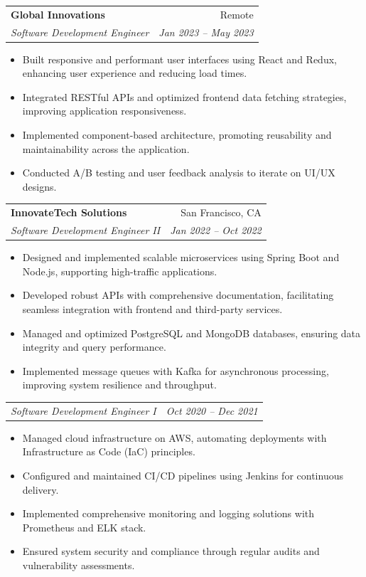 \documentclass[letterpaper,10pt]{article}
\makeatletter
\newcommand{\resumeSubheading}[4]{
  \vspace{-1pt}\item
    \begin{tabular*}{0.97\textwidth}[t]{l@{\extracolsep{\fill}}r}
      \textbf{#1} & #2 \\
      \textit{\footnotesize#3} & \textit{\footnotesize #4} \\
    \end{tabular*}\vspace{-5pt}
}
\newcommand{\resumeSubSubheading}[2]{
    \begin{tabular*}{0.97\textwidth}{l@{\extracolsep{\fill}}r}
      \textit{\footnotesize#1} & \textit{\footnotesize #2} \\
    \end{tabular*}\vspace{-5pt}
}
\newcommand{\resumeItemListStart}{\begin{itemize}}
\newcommand{\resumeItemListEnd}{\end{itemize}\vspace{-5pt}}
\makeatother
\begin{document}
    \resumeSubheading
      {Global Innovations}{Remote}
      {Software Development Engineer}{Jan 2023 -- May 2023}
      \resumeItemListStart
        \item \small Built responsive and performant user interfaces using React and Redux, enhancing user experience and reducing load times.
        \item \small Integrated RESTful APIs and optimized frontend data fetching strategies, improving application responsiveness.
        \item \small Implemented component-based architecture, promoting reusability and maintainability across the application.
        \item \small Conducted A/B testing and user feedback analysis to iterate on UI/UX designs.
      \resumeItemListEnd

    \resumeSubheading
      {InnovateTech Solutions}{San Francisco, CA}
      {Software Development Engineer II}{Jan 2022 -- Oct 2022}
      \resumeItemListStart
        \item \small Designed and implemented scalable microservices using Spring Boot and Node.js, supporting high-traffic applications.
        \item \small Developed robust APIs with comprehensive documentation, facilitating seamless integration with frontend and third-party services.
        \item \small Managed and optimized PostgreSQL and MongoDB databases, ensuring data integrity and query performance.
        \item \small Implemented message queues with Kafka for asynchronous processing, improving system resilience and throughput.
      \resumeItemListEnd

      \resumeSubSubheading{Software Development Engineer I}{Oct 2020 -- Dec 2021}
      \resumeItemListStart
        \item \small Managed cloud infrastructure on AWS, automating deployments with Infrastructure as Code (IaC) principles.
        \item \small Configured and maintained CI/CD pipelines using Jenkins for continuous delivery.
        \item \small Implemented comprehensive monitoring and logging solutions with Prometheus and ELK stack.
        \item \small Ensured system security and compliance through regular audits and vulnerability assessments.
      \resumeItemListEnd
\end{document}
